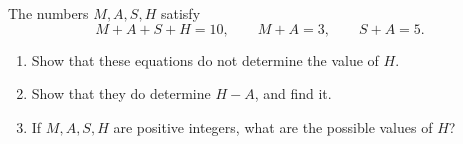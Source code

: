 The numbers $M,A,S,H$ satisfy
\[M+A+S+H=10,\qquad M+A=3,\qquad S+A=5.\]
\begin{enumerate}
\item[(a)] Show that these equations do not determine the value of $H$.
\item[(b)] Show that they do determine $H-A$, and find it.
\item[(c)] If $M,A,S,H$ are positive integers, what are the possible values of $H$?
\end{enumerate}
